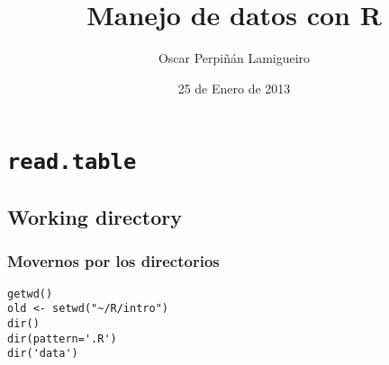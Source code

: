 \documentclass[bigger]{beamer}
\title{Manejo de datos con R}
\author{Oscar Perpiñán Lamigueiro}
\date{25 de Enero de 2013}
\begin{document}
\maketitle


\section{\texttt{read.table}}
\label{sec-1}
\subsection{Working directory}
\label{sec-1-1}
\begin{frame}[fragile]
\frametitle{Movernos por los directorios}
\label{sec-1-1-1}


\lstset{language=R}
\begin{lstlisting}
getwd()
old <- setwd("~/R/intro")
dir()
dir(pattern='.R')
dir('data')
\end{lstlisting}
\end{frame}
\end{document}
